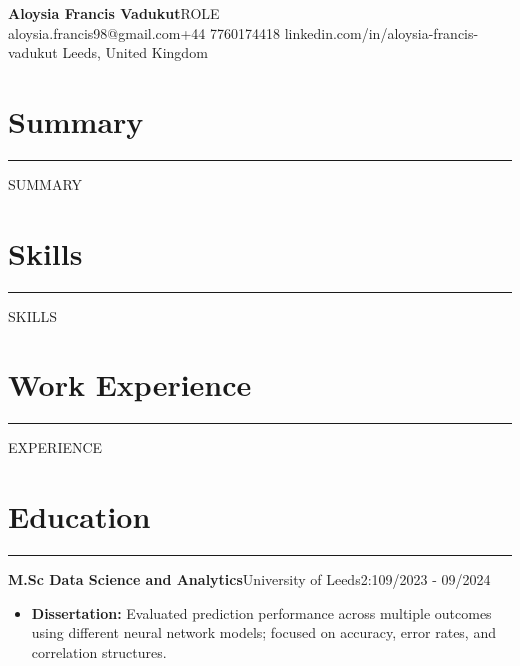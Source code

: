 \documentclass[a4paper,10pt]{article}
\begin{document}
\begin{center}
    {\LARGE \textbf{Aloysia Francis Vadukut}\hspace{3pt}\textbar{}\hspace{3pt}\LARGE {{ROLE}}}
    \\
    \vspace{5pt}
    aloysia.francis98@gmail.com\textbar{}+44 7760174418 \textbar{} linkedin.com/in/aloysia-francis-vadukut \textbar{} Leeds, United Kingdom 
\end{center}
\section{\textbf{Summary}}
\vspace{0.15em}
\hrule
\vspace{0.15em}
{{SUMMARY}}

\section{\textbf{Skills}}
\vspace{0.15em}
\hrule
\vspace{0.15em}

{{SKILLS}}
  

   
\section{\textbf{Work Experience}}
\vspace{0.15em}
\hrule
\vspace{0.15em}

{{EXPERIENCE}}

\section{\textbf{Education}}
\vspace{0.15em}
\hrule
\vspace{0.15em}

\textbf{M.Sc Data Science and Analytics}\hspace{3pt}\textbar{}\hspace{3pt}University of Leeds\hspace{3pt}\textbar{}\hspace{3pt}2:1\hspace{3pt}\textbar{}\hspace{3pt}09/2023 - 09/2024
\begin{itemize}[left=0pt, topsep=0pt, partopsep=0pt]
\item\textbf{Dissertation:} Evaluated prediction performance across multiple outcomes using different neural network models; focused on accuracy, error rates, and correlation structures.
\end{itemize}
\end{document}
